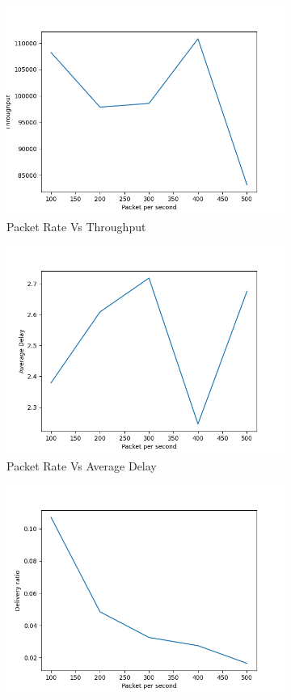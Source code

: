 \begin{figure}[h]
\begin{subfigure}{.5\textwidth}
  \centering
  \includegraphics[width=.8\linewidth]{_11_2_mobile/PacketpersecondvsThroughput.png}
     \caption{Packet Rate Vs Throughput}
    \label{packet_rate_throughput_mobile}
\end{subfigure}
\begin{subfigure}{.5\textwidth}
  \centering
  \includegraphics[width=.8\linewidth]{_11_2_mobile/PacketpersecondvsAverageDelay.png}
    \caption{Packet Rate Vs Average Delay}
     \label{packet_rate_delay_mobile}
\end{subfigure}
\begin{subfigure}{.5\textwidth}
  \centering
  \includegraphics[width=.8\linewidth]{_11_2_mobile/PacketpersecondvsDeliveryRatio.png}

\end{subfigure}
\end{figure}
